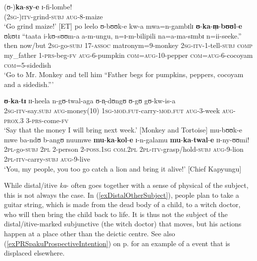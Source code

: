 \begin{exe}
\ex \label{exDistalFirstExamples}
\gll (ʊ-)\textbf{ka}-\textbf{sy}-\textbf{e} ɪ-fi-lombe!\\
(\textsc{2sg}-)\textsc{itv}-grind-\textsc{subj} \textsc{aug}-8-maize\\
\glt `Go grind maize!' [ET]
\ex \label{exDistalBuuka1}
\gll po leelo ʊ-bʊʊk-e kw-a mwa=n-gambɪlɪ \textbf{ʊ}-\textbf{ka}-\textbf{m̩}-\textbf{bʊʊl}-\textbf{e} ʊkʊtɪ ``taata i-kʊ-sʊʊm-a a-m-ungu, n=ɪ-m-bilipili na=a-ma-sɪmbɪ n=ii-seeke.''\\
then now/but \textsc{2sg}-go-\textsc{subj} 17-\textsc{assoc} matronym=9-monkey \textsc{2sg}-\textsc{itv}-1-tell-\textsc{subj} \textsc{comp} \phantom{\lq\lq}my\_father 1-\textsc{prs}-beg-\textsc{fv} \textsc{aug}-6-pumpkin \textsc{com}=\textsc{aug}-10-pepper \textsc{com}=\textsc{aug}-6-cocoyam \textsc{com}=5-sidedish\\
\glt `Go to Mr. Monkey and tell him ``Father begs for pumpkins, peppers, cocoyam and a sidedish.''{}'

\sn \gll \textbf{ʊ}-\textbf{ka}-\textbf{tɪ} ɪɪ-heela n-gʊ-twal-aga ʊ-n̩-dʊngʊ ʊ-gʊ gʊ-kw-is-a\\ 
 \textsc{2sg}-\textsc{itv}-say.\textsc{subj} \textsc{aug}-money(10) \textsc{1sg}-\textsc{mod.fut}-carry-\textsc{mod.fut} \textsc{aug}-3-week \textsc{aug}-\textsc{prox.3} 3-\textsc{prs}-come-\textsc{fv}\\
\glt \lq Say that the money I will bring next week.' [Monkey and Tortoise]
\ex \label{exDistalBuuka2}
\gll mu-bʊʊk-e mwe ba-ndʊ b-angʊ nuumwe \textbf{mu}-\textbf{ka}-\textbf{kol}-\textbf{e} ɪ-n-galamu \textbf{mu}-\textbf{ka}-\textbf{twal}-\textbf{e} ɪɪ-ny-ʊʊmi!\\
\textsc{2pl}-go-\textsc{subj} \textsc{2pl} 2-person 2-\textsc{poss.1sg} \textsc{com.2pl} \textsc{2pl}-\textsc{itv}-grasp/hold-\textsc{subj} \textsc{aug}-9-lion \textsc{2pl}-\textsc{itv}-carry-\textsc{subj} \textsc{aug}-9-live\\
\glt `You, my people, you too  go catch a lion and bring it alive!' [Chief Kapyungu]
\end{exe}

While distal/itive \textit{ka}- often goes together with a sense of physical  of the subject, this is not always the case. In (\ref{exDistalOtherSubject}), people plan to take a guitar string, which is made from the dead body of a child, to a witch doctor, who will then bring the child back to life. It is thus not the subject of the distal/itive-marked subjunctive (the witch doctor) that moves, but his actions happen at a place other than the deictic centre. See also (\ref{exPRSpakuProspectiveIntention}) on p.\nobreakspace\pageref{exPRSpakuProspectiveIntention} for an example of a  event that is displaced elsewhere. 

